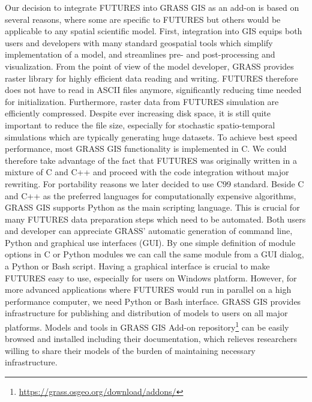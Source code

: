 \documentclass{isprs}
\begin{document}
Our decision to integrate FUTURES into GRASS GIS as an add-on is
based on several reasons, where some are specific to FUTURES but others would be applicable to any
spatial scientific model.
First, integration into GIS equips both users and developers
with many standard geospatial tools which simplify implementation of a model,
and streamlines pre- and post-processing and visualization.
From the point of view of the model developer, GRASS provides
raster library for highly efficient data reading and writing.
FUTURES therefore does not have to read in ASCII files anymore,
significantly reducing time needed for initialization.
Furthermore, raster data from FUTURES simulation are efficiently compressed.
Despite ever increasing disk space, it is still quite important to reduce the file size, especially for
stochastic spatio-temporal simulations which are typically generating huge datasets.
To achieve best speed performance,
most GRASS GIS functionality is implemented in C.
We could therefore take advantage of the fact that FUTURES was originally written
in a mixture of C and C++ and proceed with the code integration without major rewriting.
For portability reasons we later decided to use C99 standard.
Beside C and C++ as the preferred languages for computationally expensive algorithms,
GRASS GIS supports Python as the main scripting language. This is crucial
for many FUTURES data preparation steps which need to be automated.
Both users and developer can appreciate GRASS' automatic generation of
command line, Python and graphical use interfaces (GUI).
By one simple definition of module options in C or Python modules
we can call the same module from a GUI dialog, a Python or Bash script.
Having a graphical interface is crucial to make FUTURES easy to use,
especially for users on Windows platform. However, for more advanced applications
where FUTURES would run in parallel on a high performance computer,
we need Python or Bash interface.
GRASS GIS provides infrastructure for publishing and distribution of
models to users on all major platforms.
Models and tools in GRASS GIS Add-on repository\footnote{\url{https://grass.osgeo.org/download/addons/}}
can be easily browsed and installed including their documentation,
which relieves researchers willing to share their models of the burden of maintaining necessary infrastructure.
\end{document}
